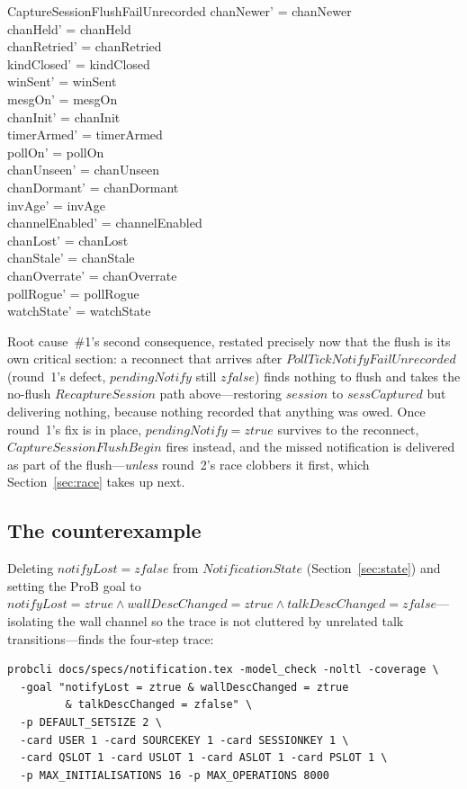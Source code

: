\documentclass[a4paper,10pt,fleqn]{article}
\begin{document}
\begin{schema}{CaptureSessionFlushFailUnrecorded}
  chanNewer' = chanNewer \\
  chanHeld' = chanHeld \\
  chanRetried' = chanRetried \\
  kindClosed' = kindClosed \\
  winSent' = winSent \\
  mesgOn' = mesgOn \\
  chanInit' = chanInit \\
  timerArmed' = timerArmed \\
  pollOn' = pollOn \\
  chanUnseen' = chanUnseen \\
  chanDormant' = chanDormant \\
  invAge' = invAge \\
  channelEnabled' = channelEnabled \\
  chanLost' = chanLost \\
  chanStale' = chanStale \\
  chanOverrate' = chanOverrate \\
  pollRogue' = pollRogue \\
  watchState' = watchState
\end{schema}

Root cause~\#1's second consequence, restated precisely now that the
flush is its own critical section: a reconnect that arrives after
$PollTickNotifyFailUnrecorded$ (round~1's defect, $pendingNotify$ still
$zfalse$) finds nothing to flush and takes the no-flush
$RecaptureSession$ path above---restoring $session$ to $sessCaptured$
but delivering nothing, because nothing recorded that anything was
owed.  Once round~1's fix is in place, $pendingNotify = ztrue$ survives
to the reconnect, $CaptureSessionFlushBegin$ fires instead, and the
missed notification is delivered as part of the flush---\emph{unless}
round~2's race clobbers it first, which Section~\ref{sec:race} takes up
next.

\subsection{The counterexample}

Deleting $notifyLost = zfalse$ from $NotificationState$
(Section~\ref{sec:state}) and setting the ProB goal to
$notifyLost = ztrue \land wallDescChanged = ztrue \land talkDescChanged
= zfalse$---isolating the wall channel so the trace is not cluttered by
unrelated talk transitions---finds the four-step trace:

\begin{verbatim}
probcli docs/specs/notification.tex -model_check -noltl -coverage \
  -goal "notifyLost = ztrue & wallDescChanged = ztrue
         & talkDescChanged = zfalse" \
  -p DEFAULT_SETSIZE 2 \
  -card USER 1 -card SOURCEKEY 1 -card SESSIONKEY 1 \
  -card QSLOT 1 -card USLOT 1 -card ASLOT 1 -card PSLOT 1 \
  -p MAX_INITIALISATIONS 16 -p MAX_OPERATIONS 8000
\end{verbatim}
\end{document}
